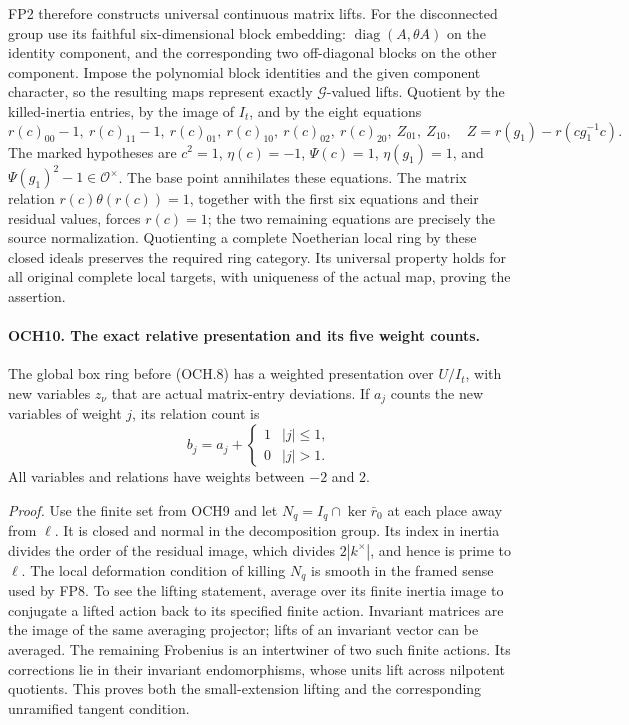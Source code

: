 FP2 therefore constructs universal continuous matrix lifts.  For the
disconnected group use its faithful six-dimensional block embedding:
\(\operatorname{diag}(A,\theta A)\) on the identity component,
and the corresponding two off-diagonal blocks on the other
component.  Impose the polynomial block identities and the given
component character, so the resulting maps represent exactly
\(\mathcal G\)-valued lifts.  Quotient by the killed-inertia
entries, by the image of \(I_t\), and by the eight equations
\[
 r(c)_{00}-1,\ r(c)_{11}-1,\ r(c)_{01},\ r(c)_{10},\
 r(c)_{02},\ r(c)_{20},\ Z_{01},\ Z_{10},
 \quad Z=r(g_1)-r(cg_1^{-1}c).
 \tag{OCH.8}
\]
The marked hypotheses are \(c^2=1\), \(\eta(c)=-1\),
\(\Psi(c)=1\), \(\eta(g_1)=1\), and
\(\Psi(g_1)^2-1\in\mathcal O^\times\).
The base point annihilates these equations.  The matrix relation
\(r(c)\theta(r(c))=1\), together with the first six equations
and their residual values, forces \(r(c)=1\); the two remaining
equations are precisely the source normalization.
Quotienting a complete Noetherian local ring by these closed ideals
preserves the required ring category.  Its universal property holds
for all original complete local targets, with uniqueness of the
actual map, proving the assertion.

\paragraph{OCH10. The exact relative presentation and its five weight counts.}
\label{claim:OCH10}
The global box ring before (OCH.8) has a weighted presentation over
\(U/I_t\), with new variables \(z_\nu\) that are actual
matrix-entry deviations.  If \(a_j\) counts the new variables
of weight \(j\), its relation count is
\[
        b_j=a_j+\begin{cases}1&|j|\le1,\\0&|j|>1.\end{cases}
 \tag{OCH.9}
\]
All variables and relations have weights between \(-2\) and \(2\).

\emph{Proof.}
Use the finite set from OCH9 and let
\(N_q=I_q\cap\ker\bar r_0\) at each place away from
\(\ell\).  It is closed and normal in the decomposition group.
Its index in inertia divides the order of the residual image,
which divides \(2|k^\times|\), and hence is prime to \(\ell\).
The local deformation condition of killing \(N_q\) is smooth
in the framed sense used by FP8.  To see the lifting statement,
average over its finite inertia image to conjugate a lifted action
back to its specified finite action.  Invariant matrices are the
image of the same averaging projector; lifts of an invariant vector
can be averaged.  The remaining Frobenius is an intertwiner of two
such finite actions.  Its corrections lie in their invariant
endomorphisms, whose units lift across nilpotent quotients.  This
proves both the small-extension lifting and the corresponding
unramified tangent condition.

